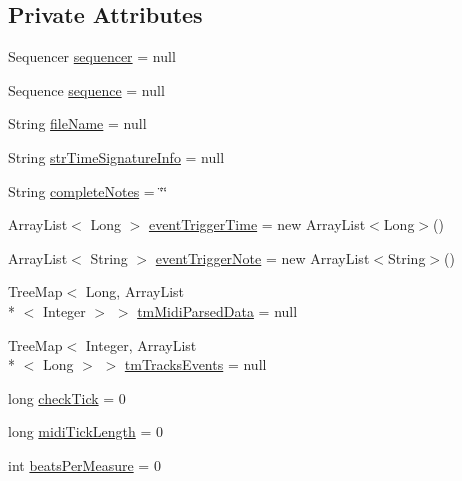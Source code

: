 \subsection*{Private Attributes}
\begin{DoxyCompactItemize}
\item 
Sequencer \hyperlink{classcom_1_1lclion_1_1midiparser_1_1_m_i_d_i_parser_a857733a65a16f85598c03acd97305607}{sequencer} = null
\item 
Sequence \hyperlink{classcom_1_1lclion_1_1midiparser_1_1_m_i_d_i_parser_aae9bd69432c806ce0c10016839a874a2}{sequence} = null
\item 
String \hyperlink{classcom_1_1lclion_1_1midiparser_1_1_m_i_d_i_parser_a3a5f56162810aa1e371620c4c18cc82a}{file\+Name} = null
\item 
String \hyperlink{classcom_1_1lclion_1_1midiparser_1_1_m_i_d_i_parser_a9ade7b0db4d14601924d1d67a9a98c96}{str\+Time\+Signature\+Info} = null
\item 
String \hyperlink{classcom_1_1lclion_1_1midiparser_1_1_m_i_d_i_parser_a3c9243db1d16921999625d8c92137085}{complete\+Notes} = \char`\"{}\char`\"{}
\item 
Array\+List$<$ Long $>$ \hyperlink{classcom_1_1lclion_1_1midiparser_1_1_m_i_d_i_parser_a74fa4197a892bf1767a6e5eb295e00ab}{event\+Trigger\+Time} = new Array\+List$<$Long$>$()
\item 
Array\+List$<$ String $>$ \hyperlink{classcom_1_1lclion_1_1midiparser_1_1_m_i_d_i_parser_a3a6a37f76d1411625bac106b93d1c1b7}{event\+Trigger\+Note} = new Array\+List$<$String$>$()
\item 
Tree\+Map$<$ Long, Array\+List\\*
$<$ Integer $>$ $>$ \hyperlink{classcom_1_1lclion_1_1midiparser_1_1_m_i_d_i_parser_aaa5da6a46779f30b5e491729559ab183}{tm\+Midi\+Parsed\+Data} = null
\item 
Tree\+Map$<$ Integer, Array\+List\\*
$<$ Long $>$ $>$ \hyperlink{classcom_1_1lclion_1_1midiparser_1_1_m_i_d_i_parser_ac3ef5d55fe6e4c55e06efa4d6a4f05b3}{tm\+Tracks\+Events} = null
\item 
long \hyperlink{classcom_1_1lclion_1_1midiparser_1_1_m_i_d_i_parser_afe73b681d8322ca28bb66fab4764b310}{check\+Tick} = 0
\item 
long \hyperlink{classcom_1_1lclion_1_1midiparser_1_1_m_i_d_i_parser_aec0bccc7b1362ff3393cf1f13f0f89b1}{midi\+Tick\+Length} = 0
\item 
int \hyperlink{classcom_1_1lclion_1_1midiparser_1_1_m_i_d_i_parser_aa3851167fb02270887162e55dfb5d370}{beats\+Per\+Measure} = 0

\end{DoxyCompactItemize}
